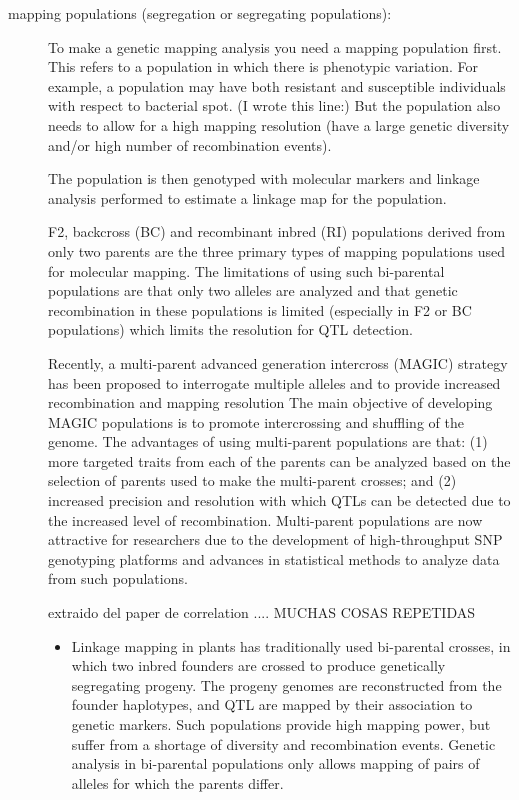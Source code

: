 \documentclass[a4paper,10pt]{article}
\begin{document}
\begin{description}
\item[mapping populations (segregation or segregating populations):]  To make a genetic mapping analysis you need a mapping population first. This refers to a population in which there is phenotypic variation.
For example, a population may have both resistant and susceptible individuals with respect to bacterial spot.  
(I wrote this line:) But the population also needs to allow for a high mapping resolution (have a large genetic diversity and/or high number of recombination events).

The population is then genotyped with molecular markers and linkage analysis performed to estimate a linkage map for the population.

F2, backcross (BC) and recombinant inbred (RI) populations derived from only two parents are the three primary types of mapping populations used for molecular mapping.
The limitations of using such bi-parental populations are that only two alleles are analyzed and that genetic recombination in these populations is limited (especially in F2 or BC populations) which limits the resolution for QTL detection.

Recently, a multi-parent advanced generation intercross (MAGIC) strategy has been proposed to interrogate multiple alleles and to provide increased recombination and mapping resolution
The main objective of developing MAGIC populations is to promote intercrossing and shuffling of the genome.
The advantages of using multi-parent populations are that:
(1) more targeted traits from each of the parents can be analyzed based on the selection of parents used to make the multi-parent crosses; and
(2) increased precision and resolution with which QTLs can be detected due to the increased level of recombination. 
Multi-parent populations are now attractive for researchers due to the development of high-throughput SNP genotyping platforms and advances in statistical methods to analyze data from such populations.





extraido del paper de correlation .... MUCHAS COSAS REPETIDAS

\begin{itemize}
 \item Linkage mapping in plants has traditionally used bi-parental crosses, in which two inbred founders are crossed to produce genetically segregating progeny. 
The progeny genomes are reconstructed from the founder haplotypes, and QTL are mapped by their association to genetic markers. 
Such populations provide high mapping power, but suffer from a shortage of diversity and recombination events.
Genetic analysis in bi-parental populations only allows mapping of pairs of alleles for which the parents differ.


\end{itemize}
\end{description}
\end{document}
